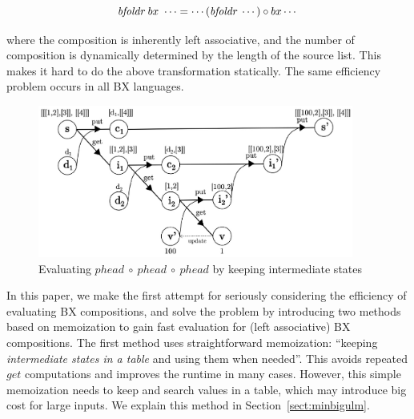 \minusvspacetwo
 \[
 \mbox{\it bfoldr}~bx~\cdots = \cdots  (\mbox{\it bfoldr}~\cdots) \circ bx \cdots
 \]
 \minusvspacetwo

\noindent where the composition is inherently left associative, and the number of composition is dynamically determined by the length of the source list. This makes it hard to do the above transformation statically. The same efficiency problem occurs in all BX languages.



\begin{figure}[!t]
  \centering
  \includegraphics[height=5cm]{./fig/fig3.eps}
  \caption{Evaluating $phead \ \circ \ phead \ \circ \ phead$ by keeping intermediate states}
  \label{fig:eval-comp-phead-2}
\end{figure}


In this paper, we make the first attempt for seriously considering the efficiency of evaluating BX compositions, and
solve the problem by introducing two methods based on memoization to gain fast evaluation for (left associative) BX compositions.
The first method uses straightforward memoization: ``keeping \emph{intermediate states in a table} and using them when needed''. This avoids repeated $get$ computations and improves the runtime in many cases. However, this simple memoization needs to keep and search values in a table, which may introduce big cost for large inputs. We explain this method in Section~\ref{sect:minbigulm}.

